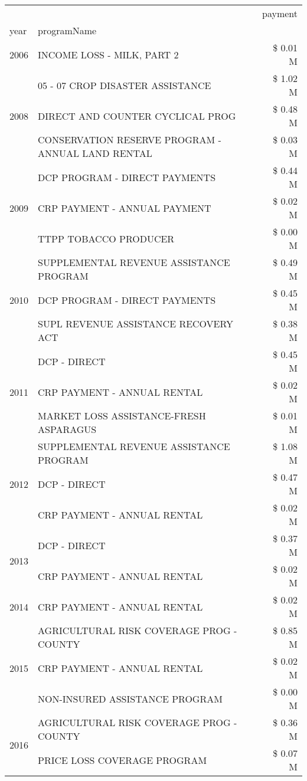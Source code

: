 \begin{tabular}{llr}
\toprule
 &  & payment \\
year & programName &  \\
\midrule
2006 & INCOME LOSS - MILK, PART 2 & \$ 0.01 M \\
\cline{1-3}
\multirow[t]{3}{*}{2008} & 05 - 07 CROP DISASTER ASSISTANCE & \$ 1.02 M \\
 & DIRECT AND COUNTER CYCLICAL PROG & \$ 0.48 M \\
 & CONSERVATION RESERVE PROGRAM - ANNUAL LAND RENTAL & \$ 0.03 M \\
\cline{1-3}
\multirow[t]{3}{*}{2009} & DCP PROGRAM - DIRECT PAYMENTS & \$ 0.44 M \\
 & CRP PAYMENT - ANNUAL PAYMENT & \$ 0.02 M \\
 & TTPP TOBACCO PRODUCER & \$ 0.00 M \\
\cline{1-3}
\multirow[t]{3}{*}{2010} & SUPPLEMENTAL REVENUE ASSISTANCE PROGRAM & \$ 0.49 M \\
 & DCP PROGRAM - DIRECT PAYMENTS & \$ 0.45 M \\
 & SUPL REVENUE ASSISTANCE RECOVERY ACT & \$ 0.38 M \\
\cline{1-3}
\multirow[t]{3}{*}{2011} & DCP - DIRECT & \$ 0.45 M \\
 & CRP PAYMENT - ANNUAL RENTAL & \$ 0.02 M \\
 & MARKET LOSS ASSISTANCE-FRESH ASPARAGUS & \$ 0.01 M \\
\cline{1-3}
\multirow[t]{3}{*}{2012} & SUPPLEMENTAL REVENUE ASSISTANCE PROGRAM & \$ 1.08 M \\
 & DCP - DIRECT & \$ 0.47 M \\
 & CRP PAYMENT - ANNUAL RENTAL & \$ 0.02 M \\
\cline{1-3}
\multirow[t]{2}{*}{2013} & DCP - DIRECT & \$ 0.37 M \\
 & CRP PAYMENT - ANNUAL RENTAL & \$ 0.02 M \\
\cline{1-3}
2014 & CRP PAYMENT - ANNUAL RENTAL & \$ 0.02 M \\
\cline{1-3}
\multirow[t]{3}{*}{2015} & AGRICULTURAL RISK COVERAGE PROG - COUNTY & \$ 0.85 M \\
 & CRP PAYMENT - ANNUAL RENTAL & \$ 0.02 M \\
 & NON-INSURED ASSISTANCE PROGRAM & \$ 0.00 M \\
\cline{1-3}
\multirow[t]{3}{*}{2016} & AGRICULTURAL RISK COVERAGE PROG - COUNTY & \$ 0.36 M \\
 & PRICE LOSS COVERAGE PROGRAM & \$ 0.07 M \\

\end{tabular}
